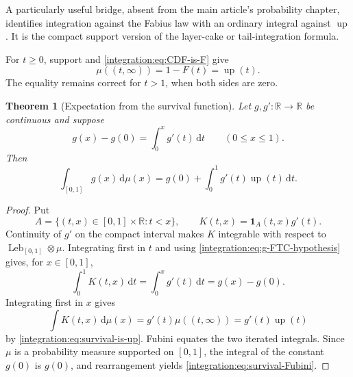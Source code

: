 \documentclass[11pt,oneside]{article}
\newtheorem{theorem}{Theorem}[section]
\theoremstyle{definition}
\theoremstyle{remark}
\newcommand{\R}{\mathbb R}
\newcommand{\Up}{\operatorname{up}}
\newcommand{\dd}{\,\mathrm d}
\begin{document}
A particularly useful bridge, absent from the main article's probability chapter, identifies
integration against the Fabius law with an ordinary integral against $\Up$.  It is the compact
support version of the layer-cake or tail-integration formula.

For $t\ge0$, support and \eqref{integration:eq:CDF-is-F} give
\begin{equation}
 \mu((t,\infty))=1-F(t)=\Up(t).
 \label{integration:eq:survival-is-up}
\end{equation}
The equality remains correct for $t>1$, when both sides are zero.

\begin{theorem}[Expectation from the survival function]
\label{integration:thm:survival-Fubini}
Let $g,g':\R\to\R$ be continuous and suppose
\begin{equation}
 g(x)-g(0)=\int_0^x g'(t)\dd t
 \qquad(0\le x\le1).
 \label{integration:eq:g-FTC-hypothesis}
\end{equation}
Then
\begin{equation}
 \int_{[0,1]}g(x)\dd\mu(x)
 =g(0)+\int_0^1 g'(t)\Up(t)\dd t.
 \label{integration:eq:survival-Fubini}
\end{equation}
\end{theorem}

\begin{proof}
Put
\begin{equation}
 A=\{(t,x)\in[0,1]\times\R:t<x\},
 \qquad
 K(t,x)=\mathbf1_A(t,x)g'(t).
 \label{integration:eq:Fubini-kernel}
\end{equation}
Continuity of $g'$ on the compact interval makes $K$ integrable with respect to
$\operatorname{Leb}_{[0,1]}\otimes\mu$.  Integrating first in $t$ and using
\eqref{integration:eq:g-FTC-hypothesis} gives, for $x\in[0,1]$,
\begin{equation}
 \int_0^1K(t,x)\dd t=\int_0^xg'(t)\dd t=g(x)-g(0).
 \label{integration:eq:Fubini-first-order}
\end{equation}
Integrating first in $x$ gives
\begin{equation}
 \int K(t,x)\dd\mu(x)=g'(t)\mu((t,\infty))=g'(t)\Up(t)
 \label{integration:eq:Fubini-second-order}
\end{equation}
by \eqref{integration:eq:survival-is-up}.  Fubini equates the two iterated integrals.  Since $\mu$ is a
probability measure supported on $[0,1]$, the integral of the constant $g(0)$ is $g(0)$,
and rearrangement yields \eqref{integration:eq:survival-Fubini}.
\end{proof}
\end{document}
